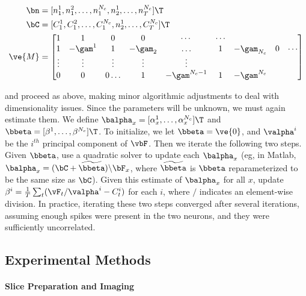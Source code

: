 \begin{align} \label{eq:M2}
\bn &=  [n^1_1, n^2_1, \ldots, n^{N_c}_1, n^1_2, \ldots, n^{N_c}_T]\T \\
\bC &=  [C^1_1, C^2_1, \ldots, C^{N_c}_1, n^1_2, \ldots, C^{N_c}_T]\T \\
\ve{M} &= %
\begin{bmatrix}
1 & 1 & 0 & 0 & \cdots & \cdots \\
1 & -\gam^1 & 1 & -\gam_2 & \ldots & 1 & -\gam_{N_c}  & 0 & \cdots \\
\vdots & \vdots & \vdots & \vdots & \vdots  \\
0 & 0 & 0 \ldots & 1 & -\gam^{N_c-1} & 1 & -\gam^{N_c}
\end{bmatrix}
\end{align} 

\noindent and proceed as above, making minor algorithmic adjustments to deal with dimensionality issues.  Since the parameters will be unknown, we must again estimate them. We define $\balpha_x=[\alpha_x^1, \ldots, \alpha_x^{N_c}]\T$ and $\bbeta=[\beta^1, \ldots, \beta^{N_c}]\T$.  To initialize, we let $\bbeta=\ve{0}$, and $\valpha^i$ be the $i^{th}$ principal component of $\vbF$.  Then we iterate the following two steps.  Given $\bbeta$, use a quadratic solver to update each $\balpha_x$ (eg, in Matlab, $\balpha_x = (\bC + \widetilde{\bbeta})\backslash \bF_x$, where $\widetilde{\bbeta}$ is $\bbeta$ reparameterized to be the same size as $\bC$).  Given this estimate of $\balpha_x$ for all $x$, update $\beta^i= \frac{1}{T}\sum_t (\vF_t / \valpha^i - C_t^i)$ for each $i$, where $/$ indicates an element-wise division.  In practice, iterating these two steps converged after several iterations, assuming enough spikes were present in the two neurons, and they were sufficiently uncorrelated.








\subsection{Experimental Methods} \label{sec:exp}

\paragraph{Slice Preparation and Imaging}

